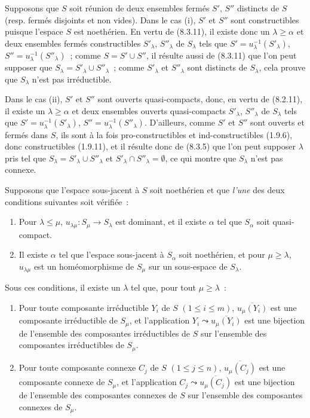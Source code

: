 Supposons que $S$ soit réunion de deux ensembles fermés $S'$, $S''$ distincts
de $S$ (resp. fermés disjoints et non vides). Dans le cas (i), $S'$ et $S''$
sont constructibles puisque l'espace $S$ est noethérien. En vertu de
(8.3.11), il existe donc un $\lambda\geq\alpha$ et deux ensembles fermés
constructibles $S'_\lambda$, $S''_\lambda$ de $S_\lambda$ tels que
$S'=u_\lambda^{-1}(S'_\lambda)$,
$S''=u_\lambda^{-1}(S''_\lambda)$~; comme $S=S'\cup S''$, il résulte aussi
de (8.3.11) que l'on peut supposer que
$S_\lambda=S'_\lambda\cup S''_\lambda$~; comme $S'_\lambda$ et
$S''_\lambda$ sont distincts de $S_\lambda$, cela prouve que $S_\lambda$
n'est pas irréductible.

Dans le cas (ii), $S'$ et $S''$ sont ouverts quasi-compacts, donc, en vertu
de (8.2.11), il existe un $\lambda\geq\alpha$ et deux ensembles ouverts
quasi-compacts $S'_\lambda$, $S''_\lambda$ de $S_\lambda$ tels que
$S'=u_\lambda^{-1}(S'_\lambda)$,
$S''=u_\lambda^{-1}(S''_\lambda)$. D'ailleurs, comme $S'$ et $S''$ sont
ouverts et fermés dans $S$, ils sont à la fois pro-constructibles et
ind-constructibles (1.9.6), donc constructibles (1.9.11), et il résulte donc
de (8.3.5) que l'on peut supposer $\lambda$ pris tel que
$S_\lambda=S'_\lambda\cup S''_\lambda$ et
$S'_\lambda\cap S''_\lambda=\emptyset$, ce qui montre que $S_\lambda$
n'est pas connexe.

\begin{proposition}[8.4.2]
\label{IV.8.4.2-fr}
Supposons que l'espace sous-jacent à $S$ soit noethérien et que \emph{l'une} des deux
conditions suivantes soit vérifiée~:
\begin{enumerate}
\item[\emph{a)}] Pour $\lambda\leq\mu$,
$u_{\lambda\mu}:S_\mu\to S_\lambda$ est dominant, et il existe $\alpha$ tel
que $S_\alpha$ soit quasi-compact.
\item[\emph{b)}] Il existe $\alpha$ tel que l'espace sous-jacent à
$S_\alpha$ soit noethérien, et pour $\mu\geq\lambda$, $u_{\lambda\mu}$ est
un homéomorphisme de $S_\mu$ sur un sous-espace de $S_\lambda$.
\end{enumerate}

Sous ces conditions, il existe un $\lambda$ tel que, pour tout
$\mu\geq\lambda$~:
\begin{enumerate}
\item[\textup{(i)}] Pour toute composante irréductible $Y_i$ de $S$
$(1\leq i\leq m)$, $\overline{u_\mu(Y_i)}$ est une composante irréductible
de $S_\mu$, et l'application $Y_i\leadsto\overline{u_\mu(Y_i)}$ est une
bijection de l'ensemble des composantes irréductibles de $S$ sur l'ensemble
des composantes irréductibles de $S_\mu$.
\item[\textup{(ii)}] Pour toute composante connexe $C_j$ de $S$
$(1\leq j\leq n)$, $\overline{u_\mu(C_j)}$ est une composante connexe de
$S_\mu$, et l'application $C_j\leadsto\overline{u_\mu(C_j)}$ est une
bijection de l'ensemble des composantes connexes de $S$ sur l'ensemble des
composantes connexes de $S_\mu$.
\end{enumerate}
\end{proposition}

